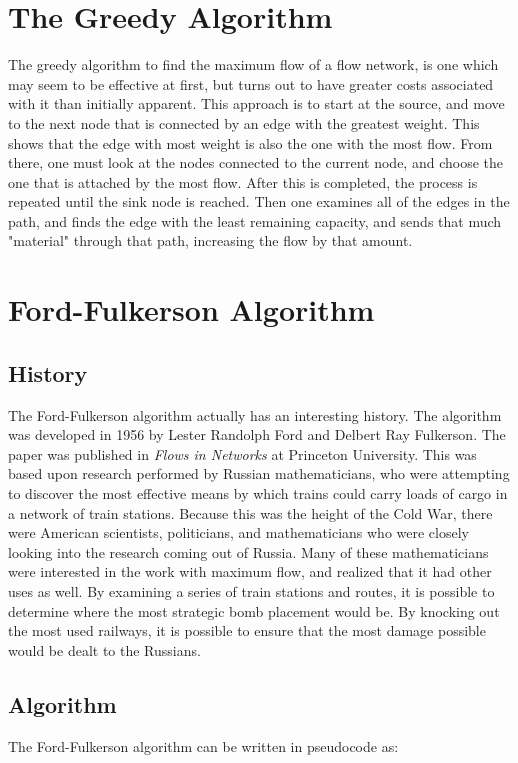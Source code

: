\documentclass[conference]{IEEEtran}
\begin{document}
\section{The Greedy Algorithm}
The greedy algorithm to find the maximum flow of a flow network, is one which may seem to be effective at first, but turns out to have greater costs associated with it than initially apparent. This approach is to start at the source, and move to the next node that is connected by an edge with the greatest weight. This shows that the edge with most weight is also the one with the most flow. From there, one must look at the nodes connected to the current node, and choose the one that is attached by the most flow. After this is completed, the process is repeated until the sink node is reached. Then one examines all of the edges in the path, and finds the edge with the least remaining capacity, and sends that much "material" through that path, increasing the flow by that amount.

\section{Ford-Fulkerson Algorithm}
\subsection{History}
The Ford-Fulkerson algorithm actually has an interesting history. 
The algorithm was developed in 1956 by Lester Randolph Ford and Delbert Ray Fulkerson. The paper was published in \textit{Flows in Networks} at Princeton University. This was based upon research performed by Russian mathematicians, who were attempting to discover the most effective means by which trains could carry loads of cargo in a network of train stations. Because this was the height of the Cold War, there were American scientists, politicians, and mathematicians who were closely looking into the research coming out of Russia. Many of these mathematicians were interested in the work with maximum flow, and realized that it had other uses as well. By examining a series of train stations and routes, it is possible to determine where the most strategic bomb placement would be. By knocking out the most used railways, it is possible to ensure that the most damage possible would be dealt to the Russians.

\subsection{Algorithm}
The Ford-Fulkerson algorithm can be written in pseudocode\cite{CLRS:2001} as:
\end{document}
